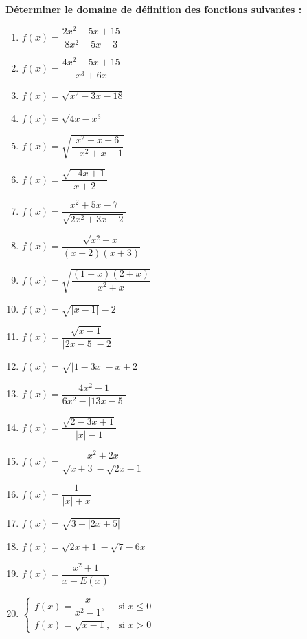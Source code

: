 \documentclass{article}
\begin{document}
 \quad \textbf{Déterminer le domaine de définition des fonctions suivantes :}

\bigskip

\noindent
\begin{multicols}{3}
\smaller
{} %
\begin{enumerate}
    \item $f(x) = \dfrac{2x^2 - 5x + 15}{8x^2 - 5x - 3}$
    \item $f(x) = \dfrac{4x^2 - 5x + 15}{x^3 + 6x}$
    \item $f(x) = \sqrt{x^2 - 3x - 18}$
    \item $f(x) = \sqrt{4x - x^3}$
    \item $f(x) = \sqrt{\dfrac{x^2 + x - 6}{-x^2 + x - 1}}$
    \item $f(x) = \dfrac{\sqrt{-4x+1}}{x+2}$
    \item $f(x) = \dfrac{x^2 + 5x - 7}{\sqrt{2x^2 + 3x - 2}}$
    \item $f(x) = \dfrac{\sqrt{x^2 - x}}{(x-2)(x+3)}$
    \item $f(x) = \sqrt{\dfrac{(1-x)(2+x)}{x^2 + x}}$
    \item $f(x) = \sqrt{|x-1|} - 2$
    \item $f(x) = \dfrac{\sqrt{x-1}}{|2x-5| -2}$
\end{enumerate}

\columnbreak

\begin{enumerate}
    \setcounter{enumi}{11}
    \item $f(x) = \sqrt{|1 - 3x| - x + 2}$
    \item $f(x) = \dfrac{4x^2 -1}{6x^2 - |13x - 5|}$
    \item $f(x) = \dfrac{\sqrt{2-3x+1}}{|x| - 1}$
    \item $f(x) = \dfrac{x^2 + 2x}{\sqrt{x+3} - \sqrt{2x-1}}$
    \item $f(x) = \dfrac{1}{|x| + x}$
    \item $f(x) = \sqrt{3 - |2x + 5|}$
    \item $f(x) = \sqrt{2x + 1} - \sqrt{7 - 6x}$
    \item $f(x) = \dfrac{x^2 + 1}{x - E(x)}$
    \item $\left\{
        \begin{array}{ll}
            f(x) = \dfrac{x}{x^2 - 1}, & \text{si } x \leq 0 \\
            f(x) = \sqrt{x - 1}, & \text{si } x > 0
        \end{array}
    \right.$
    

\end{enumerate}
\end{multicols}
\end{document}
